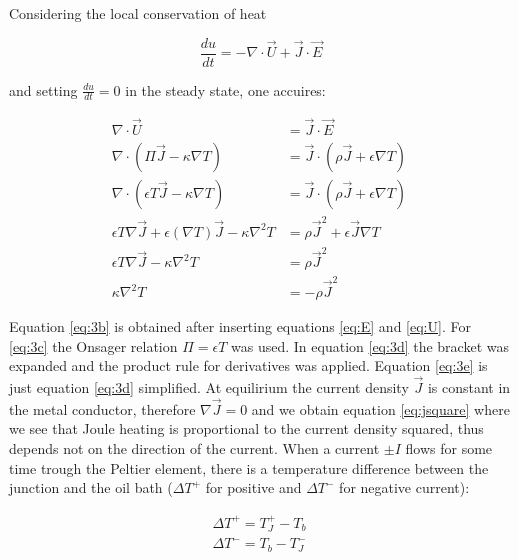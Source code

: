 \documentclass[a4paper]{article}
\begin{document}
Considering the local conservation of heat

\begin{equation}
\frac{du}{dt} = - \nabla \cdot \vec{U} + \vec{J} \cdot \vec{E}
\end{equation}

and setting $\frac{du}{dt} = 0$ in the steady state, one accuires:

\begin{subequations}
\begin{align}
	\nabla \cdot \vec{U} &= \vec{J} \cdot \vec{E} \\
	\nabla \cdot \left( \Pi \vec{J} - \kappa \nabla T \right) &= \vec{J} \cdot \left( \rho \vec{J} + \epsilon \nabla T \right) \ \label{eq:3b} \\
	\nabla \cdot \left( \epsilon T \vec{J} - \kappa \nabla T \right) &= \vec{J} \cdot \left( \rho \vec{J} + \epsilon \nabla T \right) \ \label{eq:3c} \\
	\epsilon T \nabla \vec{J} + \epsilon \left( \nabla T \right) \vec{J} - \kappa \nabla^2 T &= \rho \vec{J}^2 + \epsilon \vec{J} \nabla T \ \label{eq:3d} \\
	\epsilon T \nabla \vec{J} - \kappa \nabla^2 T &= \rho \vec{J}^2 \label{eq:3e} \\
	\kappa \nabla^2 T &= - \rho \vec{J}^2 \ \label{eq:jsquare}
\end{align}
\end{subequations}

Equation \eqref{eq:3b} is obtained after inserting equations \eqref{eq:E} and \eqref{eq:U}. For \eqref{eq:3c} the Onsager relation $\Pi = \epsilon T$ was used. In equation \eqref{eq:3d} the bracket was expanded and the product rule for derivatives was applied. Equation \eqref{eq:3e} is just equation \eqref{eq:3d} simplified. At equilirium the current density $\vec{J}$ is constant in the metal conductor, therefore $\nabla \vec{J} = 0$ and we obtain equation \eqref{eq:jsquare} where we see that Joule heating is proportional to the current density squared, thus depends not on the direction of the current.
\newline
When a current $\pm I$ flows for some time trough the Peltier element, there is a temperature difference between the junction and the oil bath ($\Delta T^{+}$ for positive and $\Delta T^{-}$ for negative current):

\begin{subequations}
\begin{align}
\Delta T^{+} = T_J^{+} - T_b \ \label{eq:deltaTp} \\
\Delta T^{-} = T_b - T_J^{-} \ \label{eq:deltaTp}
\end{align}
\end{subequations}
\end{document}
